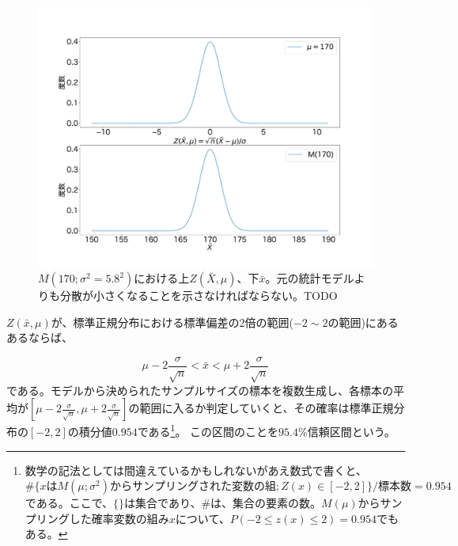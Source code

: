 \begin{figure}
    \begin{center}
        \includegraphics[width=15cm]{./image/03_/normal_Z_frequency.pdf}
        \caption{$M(170;\sigma^2=5.8^2)$における上$Z(\bar{X},\mu)$、下$\bar{x}$。元の統計モデルよりも分散が小さくなることを示さなければならない。TODO}
        \label{fig:cm_standard_normal_distribution}
    \end{center}
\end{figure}
\fi


$Z(\bar{x},\mu)$が、標準正規分布における標準偏差の2倍の範囲($-2 \sim 2$の範囲)にあるあるならば、

\begin{equation*}
 \mu - 2 \frac{\sigma}{\sqrt{n}} < \bar{x} < \mu + 2\frac{\sigma}{\sqrt{n}}
\end{equation*}
である。モデルから決められたサンプルサイズの標本を複数生成し、各標本の平均が$[\mu - 2 \frac{\sigma}{\sqrt{n}} ,\mu + 2\frac{\sigma}{\sqrt{n}}]$の範囲に入るか判定していくと、その確率は標準正規分布の$[-2,2]$の積分値$0.954$である\footnote{数学の記法としては間違えているかもしれないがあえ数式で書くと、$\#\{xはM(\mu;\sigma^2)からサンプリングされた変数の組; Z(x)\in[-2,2]\}/標本数=0.954$である。ここで、$\{\}$は集合であり、$\#{}$は、集合の要素の数。$M(\mu)$からサンプリングした確率変数の組み$x$について、$P(-2\leq z(x)\leq 2)=0.954$でもある。}。
この区間のことを$95.4\%$信頼区間という。

